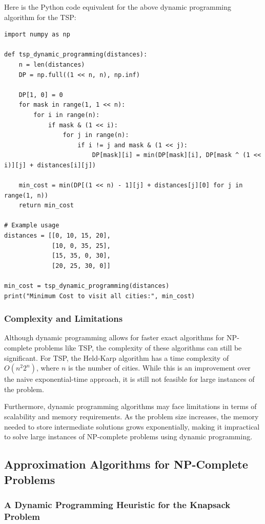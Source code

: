 \documentclass[12pt]{book} %
\begin{document}
Here is the Python code equivalent for the above dynamic programming algorithm for the TSP:
\FloatBarrier
\begin{lstlisting}
import numpy as np

def tsp_dynamic_programming(distances):
    n = len(distances)
    DP = np.full((1 << n, n), np.inf)
    
    DP[1, 0] = 0
    for mask in range(1, 1 << n):
        for i in range(n):
            if mask & (1 << i):
                for j in range(n):
                    if i != j and mask & (1 << j):
                        DP[mask][i] = min(DP[mask][i], DP[mask ^ (1 << i)][j] + distances[i][j])
    
    min_cost = min(DP[(1 << n) - 1][j] + distances[j][0] for j in range(1, n))
    return min_cost

# Example usage
distances = [[0, 10, 15, 20],
             [10, 0, 35, 25],
             [15, 35, 0, 30],
             [20, 25, 30, 0]]

min_cost = tsp_dynamic_programming(distances)
print("Minimum Cost to visit all cities:", min_cost)
\end{lstlisting}
\FloatBarrier
\subsubsection{Complexity and Limitations}

Although dynamic programming allows for faster exact algorithms for NP-complete problems like TSP, the complexity of these algorithms can still be significant. For TSP, the Held-Karp algorithm has a time complexity of \(O(n^2 2^n)\), where \(n\) is the number of cities. While this is an improvement over the naive exponential-time approach, it is still not feasible for large instances of the problem.

Furthermore, dynamic programming algorithms may face limitations in terms of scalability and memory requirements. As the problem size increases, the memory needed to store intermediate solutions grows exponentially, making it impractical to solve large instances of NP-complete problems using dynamic programming.

\subsection{Approximation Algorithms for NP-Complete Problems}

\subsubsection{A Dynamic Programming Heuristic for the Knapsack Problem}
\end{document}
